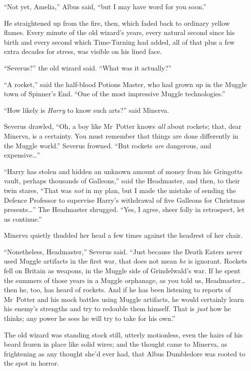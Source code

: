 “Not yet, Amelia,” Albus said, “but I may have word for you soon.”

He straightened up from the fire, then, which faded back to ordinary yellow flames. Every minute of the old wizard’s years, every natural second since his birth and every second which Time-Turning had added, all of that plus a few extra decades for stress, was visible on his lined face.

“Severus?” the old wizard said.
“What was it actually?”

“A rocket,” said the half-blood Potions Master, who had grown up in the Muggle town of Spinner’s End.
“One of the most impressive Muggle technologies.”

“How likely is \emph{Harry} to know such arts?” said Minerva.

Severus drawled,
“Oh, a boy like Mr~Potter knows \emph{all} about rockets; that, dear Minerva, is a certainty. You must remember that things are done differently in the Muggle world.” Severus frowned.
“But rockets \emph{are} dangerous, and expensive…”

“Harry has stolen and hidden an unknown amount of money from his Gringotts vault, perhaps thousands of Galleons,” said the Headmaster, and then, to their twin stares,
“That was \emph{not} in my plan, but I made the mistake of sending the Defence Professor to supervise Harry’s withdrawal of five Galleons for Christmas presents…” The Headmaster shrugged.
“Yes, I agree, sheer folly in retrospect, let us continue.”

Minerva quietly thudded her head a few times against the headrest of her chair.

“Nonetheless, Headmaster,” Severus said.
“Just because the Death Eaters never used Muggle artifacts in the first war, that does not mean \emph{he} is ignorant. Rockets fell on Britain as weapons, in the Muggle side of Grindelwald’s war. If he spent the summers of those years in a Muggle orphanage, as you told us, Headmaster…then he, too, has heard of rockets. And if he has been listening to reports of Mr~Potter and his mock battles using Muggle artifacts, he would certainly learn his enemy’s strengths and try to redouble them himself. That is \emph{just} how he thinks; any power he sees he will try to take for his own.”

The old wizard was standing stock still, utterly motionless, even the hairs of his beard frozen in place like solid wires; and the thought came to Minerva, as frightening as any thought she’d ever had, that Albus Dumbledore was rooted to the spot in horror.

